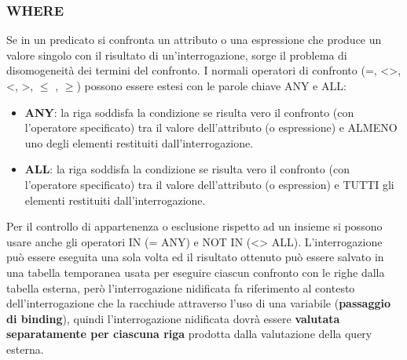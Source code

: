 \documentclass[a4paper]{article}
\begin{document}
\subsubsection{WHERE}
Se in un predicato si confronta un attributo o una espressione che produce un valore
singolo con il risultato di un’interrogazione, sorge il problema di disomogeneità dei termini
del confronto. I normali operatori di confronto (=, <>, <, >, $\le$ , $\ge$) possono
essere estesi con le parole chiave ANY e ALL:
\begin{itemize}
  \item \textbf{ANY}: la riga soddisfa la condizione se risulta vero il confronto
    (con l’operatore specificato) tra il valore dell’attributo (o espressione) e ALMENO uno
    degli elementi restituiti dall’interrogazione.

  \item \textbf{ALL}: la riga soddisfa la condizione se risulta vero il confronto
    (con l’operatore specificato) tra il valore dell’attributo (o espression) e TUTTI gli elementi restituiti dall’interrogazione.
\end{itemize}
Per il controllo di appartenenza o esclusione rispetto ad un insieme si possono usare anche
gli operatori IN (= ANY) e NOT IN (<> ALL).
L'interrogazione può essere eseguita una sola volta ed il risultato ottenuto può
essere salvato in una tabella temporanea usata per eseguire
ciascun confronto con le righe dalla tabella esterna, però  l’interrogazione nidificata
fa riferimento al contesto dell’interrogazione che la racchiude attraverso l’uso di una
variabile (\textbf{passaggio di binding}), quindi l'interrogazione nidificata
dovrà essere \textbf{valutata separatamente per ciascuna riga} prodotta dalla
valutazione della query esterna.
\end{document}
